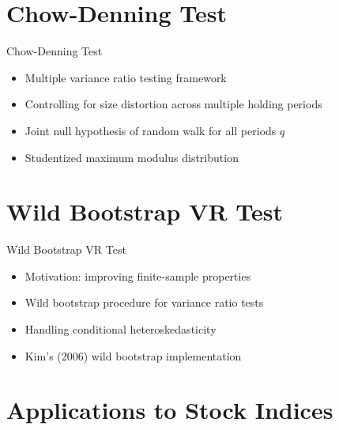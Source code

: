 \documentclass[9pt, aspectratio=169, t]{beamer}
\theoremstyle{definition}
\begin{document}
\section{Chow-Denning Test}

\begin{frame}{Chow-Denning Test}
    \begin{itemize}
        \item Multiple variance ratio testing framework
        \item Controlling for size distortion across multiple holding periods
        \item Joint null hypothesis of random walk for all periods $q$
        \item Studentized maximum modulus distribution
    \end{itemize}
\end{frame}

\section{Wild Bootstrap VR Test}

\begin{frame}{Wild Bootstrap VR Test}
    \begin{itemize}
        \item Motivation: improving finite-sample properties
        \item Wild bootstrap procedure for variance ratio tests
        \item Handling conditional heteroskedasticity
        \item Kim's (2006) wild bootstrap implementation
    \end{itemize}
\end{frame}

\section{Applications to Stock Indices}
\end{document}
